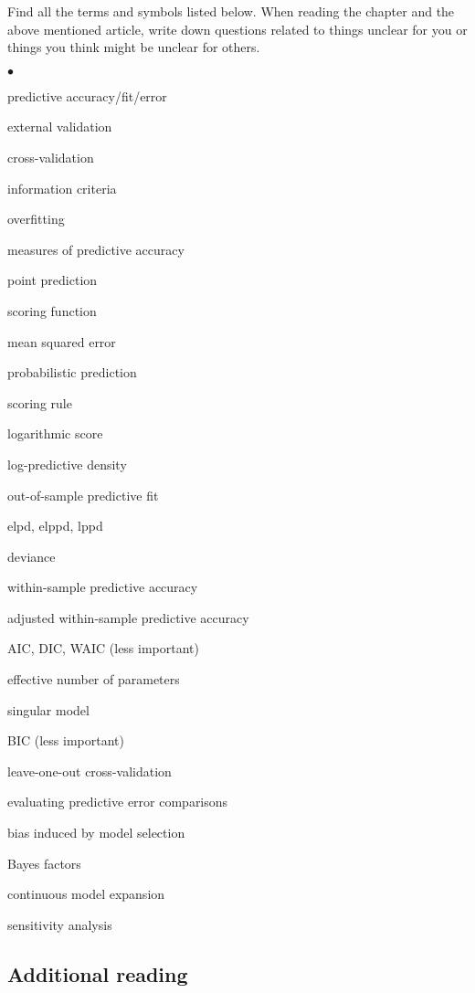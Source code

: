 \documentclass[a4paper,11pt,english]{article}
\begin{document}
Find all the terms and symbols listed below. When reading the chapter
and the above mentioned article, write down questions related to
things unclear for you or things you think might be unclear for
others.
\begin{list}{$\bullet$}{\parsep=0pt\itemsep=2pt}
\item predictive accuracy/fit/error
\item external validation
\item cross-validation
\item information criteria
\item overfitting
\item measures of predictive accuracy
\item point prediction
\item scoring function
\item mean squared error
\item probabilistic prediction
\item scoring rule
\item logarithmic score
\item log-predictive density
\item out-of-sample predictive fit
\item elpd, elppd, lppd
\item deviance
\item within-sample predictive accuracy
\item adjusted within-sample predictive accuracy
\item AIC, DIC, WAIC (less important)
\item effective number of parameters
\item singular model
\item BIC (less important)
\item leave-one-out cross-validation
\item evaluating predictive error comparisons
\item bias induced by model selection
\item Bayes factors
\item continuous model expansion
\item sensitivity analysis
\end{list}

 \subsection*{Additional reading}
\end{document}
